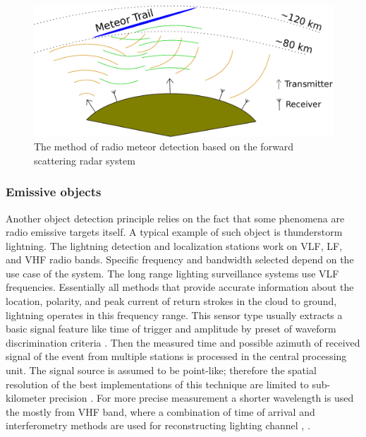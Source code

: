 \documentclass[twoside]{ctuthesis}
\theoremstyle{plain}
\theoremstyle{definition}
\theoremstyle{note}
\begin{document}
\begin{figure}
 \begin{center}
 \includegraphics[width=\linewidth]{./img/Meteor_detection.pdf}
 \caption{The method of radio meteor detection based on the forward scattering radar system}
  \label{fig:forward_scattering} 
 \end{center}
\end{figure}

\subsubsection{Emissive objects}

Another object detection principle relies on the fact that some phenomena are radio emissive targets itself. A typical example of such object is thunderstorm lightning. The lightning detection and localization stations work on VLF, LF, and VHF radio bands. Specific frequency and bandwidth selected depend on the use case of the system. The long range lighting surveillance systems use VLF frequencies. Essentially all methods that provide accurate information about the location,  polarity,  and peak current of return strokes in the cloud to ground, lightning operates in this frequency range. This sensor type usually extracts a basic signal feature like time of trigger and amplitude by preset of waveform discrimination criteria \cite{VLF_TOGA}. Then the measured time and possible azimuth of received signal of the event from multiple stations is processed in the central processing unit. The signal source is assumed to be point-like; therefore the spatial resolution of the best implementations of this technique are limited to sub-kilometer precision \cite{Lighting_locating}. 
For more precise measurement a shorter wavelength is used the mostly from VHF band, where a combination of time of arrival and interferometry methods are used for reconstructing lighting channel \cite{NALMA_algorithms}, \cite{rocket_triggered} . 
\end{document}
